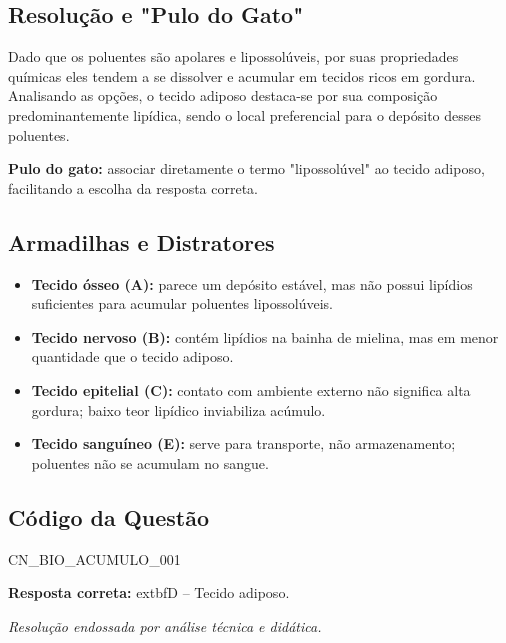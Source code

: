 \documentclass{article}
\begin{document}
\subsection*{Resolução e "Pulo do Gato"}

Dado que os poluentes são apolares e lipossolúveis, por suas propriedades químicas eles tendem a se dissolver e acumular em tecidos ricos em gordura. Analisando as opções, o tecido adiposo destaca-se por sua composição predominantemente lipídica, sendo o local preferencial para o depósito desses poluentes. 

\textbf{Pulo do gato:} associar diretamente o termo "lipossolúvel" ao tecido adiposo, facilitando a escolha da resposta correta.

\subsection*{Armadilhas e Distratores}

\begin{itemize}
  \item \textbf{Tecido ósseo (A):} parece um depósito estável, mas não possui lipídios suficientes para acumular poluentes lipossolúveis.
  \item \textbf{Tecido nervoso (B):} contém lipídios na bainha de mielina, mas em menor quantidade que o tecido adiposo.
  \item \textbf{Tecido epitelial (C):} contato com ambiente externo não significa alta gordura; baixo teor lipídico inviabiliza acúmulo.
  \item \textbf{Tecido sanguíneo (E):} serve para transporte, não armazenamento; poluentes não se acumulam no sangue.
\end{itemize}

\subsection*{Código da Questão}

CN_BIO_ACUMULO_001

\vspace{1em}

\textbf{Resposta correta:} 	extbf{D} – Tecido adiposo.

\begin{flushright}
\textit{Resolução endossada por análise técnica e didática.}
\end{flushright}
\end{document}
